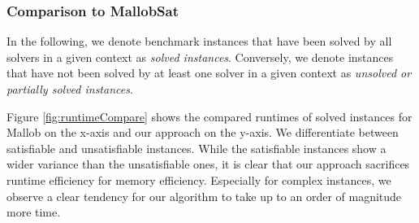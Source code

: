\documentclass[12pt,a4paper,twoside]{scrartcl}
\numberwithin{equation}{section}
\begin{document}
\subsubsection{Comparison to MallobSat}

In the following, we denote benchmark instances that have been solved by all solvers in a given context as \textit{solved instances}. Conversely, we denote instances that have not been solved by at least one solver in a given context as \textit{unsolved or partially solved instances}.

Figure \ref{fig:runtimeCompare} shows the compared runtimes of solved instances for Mallob on the x-axis and our approach on the y-axis. We differentiate between satisfiable and unsatisfiable instances. While the satisfiable instances show a wider variance than the unsatisfiable ones, it is clear that our approach sacrifices runtime efficiency for memory efficiency. Especially for complex instances, we observe a clear tendency for our algorithm to take up to an order of magnitude more time.
\end{document}
